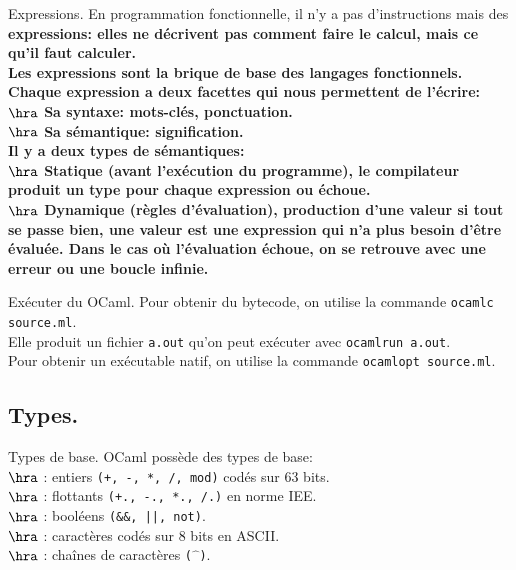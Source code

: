 \documentclass[french, 11pt]{article}
\begin{document}
\begin{defi}{Expressions.}{}
    En programmation fonctionnelle, il n'y a pas d'instructions mais des \bf{expressions}: elles ne décrivent pas comment faire le calcul, mais ce qu'il faut calculer.\\
    Les expressions sont la brique de base des langages fonctionnels. Chaque expression a deux facettes qui nous permettent de l'écrire:\\
    $\hra$ Sa syntaxe: mots-clés, ponctuation.\\
    $\hra$ Sa sémantique: signification.\\
    Il y a deux types de sémantiques:\\
    $\hra$ Statique (avant l'exécution du programme), le compilateur produit un type pour chaque expression ou échoue.\\
    $\hra$ Dynamique (règles d'évaluation), production d'une valeur si tout se passe bien, une valeur est une expression qui n'a plus besoin d'être évaluée.\n
    Dans le cas où l'évaluation échoue, on se retrouve avec une erreur ou une boucle infinie.
\end{defi}

\begin{defi}{Exécuter du OCaml.}{}
    Pour obtenir du bytecode, on utilise la commande \texttt{ocamlc source.ml}.\\
    Elle produit un fichier \texttt{a.out} qu'on peut exécuter avec \texttt{ocamlrun a.out}.\\
    Pour obtenir un exécutable natif, on utilise la commande \texttt{ocamlopt source.ml}.
\end{defi}

\subsection{Types.}

\begin{defi}{Types de base.}{}
    OCaml possède des types de base:\\
    $\hra$  : entiers \texttt{(+, -, *, /, mod)} codés sur 63 bits.\\
    $\hra$  : flottants \texttt{(+., -., *., /.)} en norme IEE.\\
    $\hra$  : booléens \texttt{(\&\&, ||, not)}.\\
    $\hra$  : caractères codés sur 8 bits en ASCII.\\
    $\hra$  : chaînes de caractères \texttt{($\hat{\phantom{a}}$)}.
\end{defi}
\end{document}
